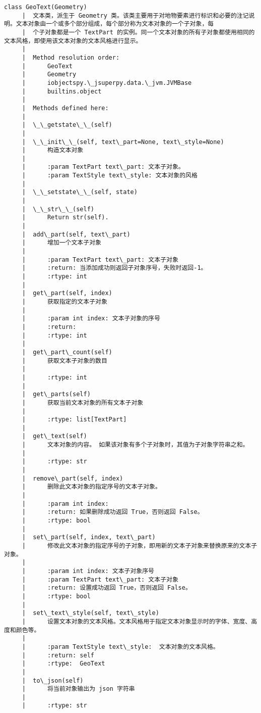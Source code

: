 \documentclass[11pt]{article}
\begin{document}
\begin{Verbatim}[commandchars=\\\{\}]
    class GeoText(Geometry)
     |  文本类，派生于 Geometry 类。该类主要用于对地物要素进行标识和必要的注记说明。文本对象由一个或多个部分组成，每个部分称为文本对象的一个子对象，每
     |  个子对象都是一个 TextPart 的实例。同一个文本对象的所有子对象都使用相同的文本风格，即使用该文本对象的文本风格进行显示。
     |  
     |  Method resolution order:
     |      GeoText
     |      Geometry
     |      iobjectspy.\_jsuperpy.data.\_jvm.JVMBase
     |      builtins.object
     |  
     |  Methods defined here:
     |  
     |  \_\_getstate\_\_(self)
     |  
     |  \_\_init\_\_(self, text\_part=None, text\_style=None)
     |      构造文本对象
     |      
     |      :param TextPart text\_part: 文本子对象。
     |      :param TextStyle text\_style: 文本对象的风格
     |  
     |  \_\_setstate\_\_(self, state)
     |  
     |  \_\_str\_\_(self)
     |      Return str(self).
     |  
     |  add\_part(self, text\_part)
     |      增加一个文本子对象
     |      
     |      :param TextPart text\_part: 文本子对象
     |      :return: 当添加成功则返回子对象序号，失败时返回-1。
     |      :rtype: int
     |  
     |  get\_part(self, index)
     |      获取指定的文本子对象
     |      
     |      :param int index: 文本子对象的序号
     |      :return:
     |      :rtype: int
     |  
     |  get\_part\_count(self)
     |      获取文本子对象的数目
     |      
     |      :rtype: int
     |  
     |  get\_parts(self)
     |      获取当前文本对象的所有文本子对象
     |      
     |      :rtype: list[TextPart]
     |  
     |  get\_text(self)
     |      文本对象的内容。 如果该对象有多个子对象时，其值为子对象字符串之和。
     |      
     |      :rtype: str
     |  
     |  remove\_part(self, index)
     |      删除此文本对象的指定序号的文本子对象。
     |      
     |      :param int index:
     |      :return: 如果删除成功返回 True，否则返回 False。
     |      :rtype: bool
     |  
     |  set\_part(self, index, text\_part)
     |      修改此文本对象的指定序号的子对象，即用新的文本子对象来替换原来的文本子对象。
     |      
     |      :param int index: 文本子对象序号
     |      :param TextPart text\_part: 文本子对象
     |      :return: 设置成功返回 True，否则返回 False。
     |      :rtype: bool
     |  
     |  set\_text\_style(self, text\_style)
     |      设置文本对象的文本风格。文本风格用于指定文本对象显示时的字体、宽度、高度和颜色等。
     |      
     |      :param TextStyle text\_style:  文本对象的文本风格。
     |      :return: self
     |      :rtype:  GeoText
     |  
     |  to\_json(self)
     |      将当前对象输出为 json 字符串
     |      
     |      :rtype: str

\end{Verbatim}
\end{document}

